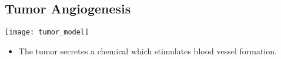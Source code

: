 \subsection*{Tumor Angiogenesis}
\begin{frame}[t]
  \begin{center}
    \texttt{[image: tumor\_model]}    
  \end{center}

  \begin{block}{}
    \begin{itemize}
    \item{%
      The tumor secretes
      a chemical which stimulates blood vessel formation.
      }
      \end{itemize}
  \end{block}
\end{frame}


